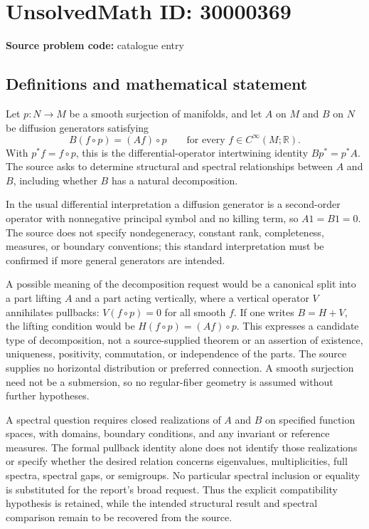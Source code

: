 \documentclass[11pt]{article}
\newcommand{\R}{\mathbb{R}}
\begin{document}
\section*{UnsolvedMath ID: 30000369}
\textbf{Source problem code:} catalogue entry
\subsection{Definitions and mathematical statement}
Let $p:N\to M$ be a smooth surjection of manifolds, and let $A$ on $M$ and $B$ on $N$ be diffusion generators satisfying
\[
 B(f\circ p)=(Af)\circ p\qquad\text{for every }f\in C^\infty(M;\R).
\]
With $p^*f=f\circ p$, this is the differential-operator intertwining identity $Bp^*=p^*A$. The source asks to determine structural and spectral relationships between $A$ and $B$, including whether $B$ has a natural decomposition.

In the usual differential interpretation a diffusion generator is a second-order operator with nonnegative principal symbol and no killing term, so $A1=B1=0$. The source does not specify nondegeneracy, constant rank, completeness, measures, or boundary conventions; this standard interpretation must be confirmed if more general generators are intended.

A possible meaning of the decomposition request would be a canonical split into a part lifting $A$ and a part acting vertically, where a vertical operator $V$ annihilates pullbacks: $V(f\circ p)=0$ for all smooth $f$. If one writes $B=H+V$, the lifting condition would be $H(f\circ p)=(Af)\circ p$. This expresses a candidate type of decomposition, not a source-supplied theorem or an assertion of existence, uniqueness, positivity, commutation, or independence of the parts. The source supplies no horizontal distribution or preferred connection. A smooth surjection need not be a submersion, so no regular-fiber geometry is assumed without further hypotheses.

A spectral question requires closed realizations of $A$ and $B$ on specified function spaces, with domains, boundary conditions, and any invariant or reference measures. The formal pullback identity alone does not identify those realizations or specify whether the desired relation concerns eigenvalues, multiplicities, full spectra, spectral gaps, or semigroups. No particular spectral inclusion or equality is substituted for the report's broad request. Thus the explicit compatibility hypothesis is retained, while the intended structural result and spectral comparison remain to be recovered from the source.
\end{document}
